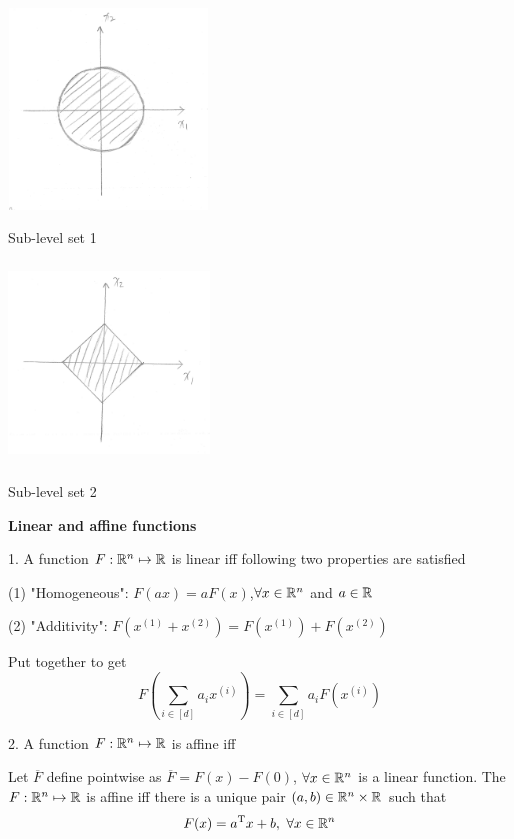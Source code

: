 \begin{marginfigure}
	\centering
	\includegraphics[width=2.1in,height=2.1in]{figures/ch02/p48-7.jpg}
	\caption{Sub-level set 1} 
\end{marginfigure}

\begin{marginfigure}
	\centering
	\includegraphics[width=2.1in,height=2.1in]{figures/ch02/p48-8.jpg}
	\caption{Sub-level set 2} 
\end{marginfigure}

\vspace{0.5cm}
\textbf{Linear and affine functions}

1. A function $F:\mathbb{R}^{n}\mapsto\mathbb{R}$ is linear iff following two properties are satisfied

(1) "Homogeneous": $F(ax)=aF(x)$,$ \forall x\in\mathbb{R}^{n}$ and $a\in\mathbb{R}$

(2) "Additivity":  $F(x^{(1)}+x^{(2)})=F(x^{(1)})+F(x^{(2)})$

Put together to get 
$$F(\sum_{i\in [d]}^{}a_{i}x^{(i)})=\sum_{i\in [d]}^{}a_{i}F(x^{(i)})$$

\vspace{0.3cm}
2. A function $F:\mathbb{R}^{n}\mapsto\mathbb{R}$ is affine iff

Let $\overline{F}$ define pointwise as $\overline{F}=F(x)-F(0)$, $\forall x\in\mathbb{R}^{n}$ is a linear function. The $F:\mathbb{R}^{n}\mapsto\mathbb{R}$ is affine iff there is a unique pair $(a,b)\in\mathbb{R}^{n}\times\mathbb{R}$ such that 
$$F(x)=a^{{\rm T}} x+b,\  \forall x\in\mathbb{R}^{n}$$

